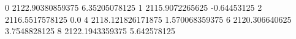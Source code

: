 0 2122.90380859375 6.35205078125
1 2115.9072265625 -0.64453125
2 2116.5517578125 0.0
4 2118.121826171875 1.570068359375
6 2120.306640625 3.7548828125
8 2122.1943359375 5.642578125
